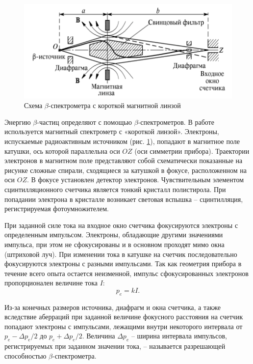 \documentclass[12pt,a4paper]{article}
\begin{document}
    \begin{figure}[h!]
		\centering
		\includegraphics[width=\linewidth]{res/scheme.png}
		\caption{Схема $\beta$-спектрометра с короткой магнитной линзой}
		\label{BetaParticles_Scheme}
	\end{figure}

	Энергию $\beta$-частиц определяют с помощью $\beta$-спектрометров. В работе используется магнитный спектрометр с «короткой линзой». Электроны, испускаемые радиоактивным источником (рис. \ref{BetaParticles_Scheme}), попадают в магнитное поле катушки, ось которой параллельна оси $OZ$ (оси симметрии прибора). Траектории электронов в магнитном поле представляют собой схематически показанные на рисунке сложные спирали, сходящиеся за катушкой в фокусе, расположенном на оси $OZ$. В фокусе установлен детектор электронов. Чувствительным элементом сцинтилляционного счетчика является тонкий кристалл полистирола. При попадании электрона в кристалле возникает световая вспышка -- сцинтилляция, регистрируемая фотоумножителем.
	
	При заданной силе тока на входное окно счетчика фокусируются электроны с определенным импульсом. Электроны, обладающие другими значениями импульса, при этом не сфокусированы и в основном проходят мимо окна (штриховой луч). При изменении тока в катушке на счетчик последовательно фокусируются электроны с разными импульсами. Так как геометрия прибора в течение всего опыта остается неизменной, импульс сфокусированных электронов пропорционален величине тока $I$:
	\begin{equation}
		p_e = kI.
		\label{BetaParticles_pkI}
	\end{equation}

	Из-за конечных размеров источника, диафрагм и окна счетчика, а также вследствие аберраций при заданной величине фокусного расстояния на счетчик попадают электроны с импульсами, лежащими внутри некоторого интервала от $p_e - \Delta p_e/2$ до $p_e + \Delta p_e/2$. Величина $\Delta p_e$ -- ширина интервала импульсов, регистрируемых при заданном значении тока, -- называется разрешающей способностью $\beta$-спектрометра.
	
\end{document}
